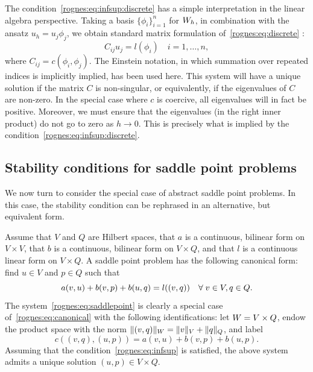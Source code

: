 The condition~\eqref{rognes:eq:infsup:discrete} has a simple interpretation
in the linear algebra perspective. Taking a basis $\{\phi_i
\}_{i=1}^n$ for $W_h$, in combination with the ansatz $u_h = u_j
\phi_j$, we obtain standard matrix formulation of~\eqref{rognes:eq:discrete}
:
\begin{equation*}
  C_{ij} u_j = l(\phi_i) \quad i = 1, \dots, n,
\end{equation*}
where $C_{ij} = c(\phi_i, \phi_j)$. The Einstein notation, in which
summation over repeated indices is implicitly implied, has been used
here. This system will have a unique solution if the matrix $C$ is
non-singular, or equivalently, if the eigenvalues of $C$ are
non-zero. In the special case where $c$ is coercive, all eigenvalues
will in fact be positive. Moreover, we must ensure that the
eigenvalues (in the right inner product) do not go to zero as $h
\rightarrow 0$. This is precisely what is implied by the
condition~\eqref{rognes:eq:infsup:discrete}.

\subsection{Stability conditions for saddle point problems}

We now turn to consider the special case of abstract saddle point
problems. In this case, the stability condition can be rephrased in an
alternative, but equivalent form.

Assume that $V$ and $Q$ are Hilbert spaces, that $a$ is a continuous,
bilinear form on $V \times V$, that $b$ is a continuous, bilinear form
on $V \times Q$, and that $l$ is a continuous linear form on $V \times
Q$. A saddle point problem has the following canonical form: find $u
\in V$ and $p \in Q$ such that
\begin{equation}
    \label{rognes:eq:saddlepoint}
    a(v, u) + b(v, p) + b(u, q) = l((v, q))
    \quad \forall \; v \in V, q \in Q.
\end{equation}
The system~\eqref{rognes:eq:saddlepoint} is clearly a special case
of~\eqref{rognes:eq:canonical} with the following identifications: let $W =
V \times Q$, endow the product space with the norm $\|(v, q)\|_{W} =
\|v\|_{V} + \|q\|_{Q}$, and label
\begin{equation*}
  c((v, q), (u, p)) = a(v, u) + b(v, p) + b(u, p).
\end{equation*}
Assuming that the condition~\eqref{rognes:eq:infsup} is satisfied,
the above system admits a unique solution $(u, p) \in V \times Q$.

